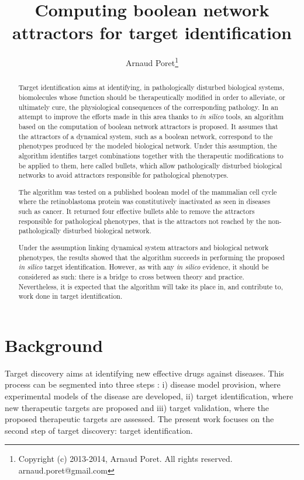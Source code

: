\documentclass[oneside,a4paper,onecolumn,notitlepage,final]{article}
\title{Computing boolean network attractors for target identification}
\author{Arnaud Poret\footnote{Copyright (c) 2013-2014, Arnaud Poret. All rights reserved. arnaud.poret@gmail.com}}
\date{}
\begin{document}
\maketitle
\tableofcontents

\begin{abstract}
Target identification aims at identifying, in pathologically disturbed biological systems, biomolecules whose function should be therapeutically modified in order to alleviate, or ultimately cure, the physiological consequences of the corresponding pathology. In an attempt to improve the efforts made in this area thanks to \textit{in silico} tools, an algorithm based on the computation of boolean network attractors is proposed. It assumes that the attractors of a dynamical system, such as a boolean network, correspond to the phenotypes produced by the modeled biological network. Under this assumption, the algorithm identifies target combinations together with the therapeutic modifications to be applied to them, here called bullets, which allow pathologically disturbed biological networks to avoid attractors responsible for pathological phenotypes.

The algorithm was tested on a published boolean model of the mammalian cell cycle where the retinoblastoma protein was constitutively inactivated as seen in diseases such as cancer. It returned four effective bullets able to remove the attractors responsible for pathological phenotypes, that is the attractors not reached by the non-pathologically disturbed biological network.

Under the assumption linking dynamical system attractors and biological network phenotypes, the results showed that the algorithm succeeds in performing the proposed \textit{in silico} target identification. However, as with any \textit{in silico} evidence, it should be considered as such: there is a bridge to cross between theory and practice. Nevertheless, it is expected that the algorithm will take its place in, and contribute to, work done in target identification.
\end{abstract}

\section{Background}
Target discovery aims at identifying new effective drugs against diseases. This process can be segmented into three steps \cite{lindsay2003target}: i) disease model provision, where experimental models of the disease are developed, ii) target identification, where new therapeutic targets are proposed and iii) target validation, where the proposed therapeutic targets are assessed. The present work focuses on the second step of target discovery: target identification.
\end{document}
